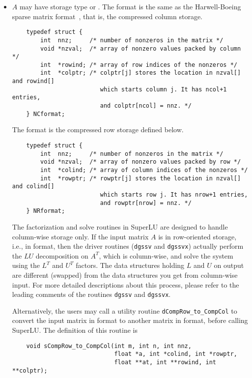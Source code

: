 \begin{itemize}
\item
$A$ may have storage type {\NC} or {\NR}.
The {\NC} format is the same as the Harwell-Boeing sparse 
matrix format~\cite{duffgrimes92}, that is, the compressed column storage.
\begin{verbatim}
    typedef struct {
        int  nnz;     /* number of nonzeros in the matrix */
        void *nzval;  /* array of nonzero values packed by column */
        int  *rowind; /* array of row indices of the nonzeros */
        int  *colptr; /* colptr[j] stores the location in nzval[] and rowind[]
                         which starts column j. It has ncol+1 entries, 
                         and colptr[ncol] = nnz. */
    } NCformat;
\end{verbatim}

The {\NR} format is the compressed row storage defined below.
\begin{verbatim}
    typedef struct {
        int  nnz;     /* number of nonzeros in the matrix */
        void *nzval;  /* array of nonzero values packed by row */
        int  *colind; /* array of column indices of the nonzeros */
        int  *rowptr; /* rowptr[j] stores the location in nzval[] and colind[]
                         which starts row j. It has nrow+1 entries,
                         and rowptr[nrow] = nnz. */
    } NRformat;
\end{verbatim}

The factorization and solve routines in SuperLU are designed to
handle column-wise storage only. If the input matrix $A$ is in row-oriented
storage, i.e., in {\NR} format, then the driver routines ({\tt dgssv} and
{\tt dgssvx}) actually perform the $LU$ decomposition on $A^T$, which
is column-wise, and solve the system using the $L^T$ and $U^T$ factors.
The data structures holding $L$ and $U$ on output are different (swapped)
from the data structures you get from column-wise input. For more detailed
descriptions about this process, please refer to the leading comments 
of the routines {\tt dgssv} and {\tt dgssvx}.

Alternatively, the users may call a utility routine {\tt dCompRow\_to\_CompCol}
to convert the input matrix in {\NR} format to another matrix
in {\NC} format, before calling SuperLU. The definition of this routine is
\begin{verbatim}
    void sCompRow_to_CompCol(int m, int n, int nnz,
                             float *a, int *colind, int *rowptr,
                             float **at, int **rowind, int **colptr);
\end{verbatim}


\end{itemize}

